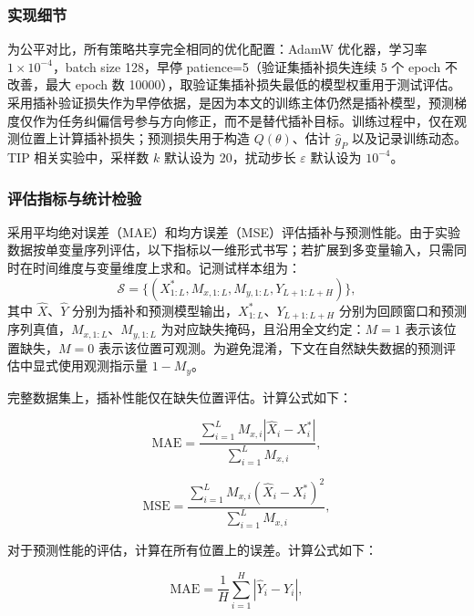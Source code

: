 \documentclass{article}
\begin{document}
\subsubsection{实现细节}

为公平对比，所有策略共享完全相同的优化配置：AdamW 优化器，学习率 $1\times10^{-4}$，batch size 128，早停 patience=5（验证集插补损失连续 5 个 epoch 不改善，最大 epoch 数 10000），取验证集插补损失最低的模型权重用于测试评估。采用插补验证损失作为早停依据，是因为本文的训练主体仍然是插补模型，预测梯度仅作为任务纠偏信号参与方向修正，而不是替代插补目标。训练过程中，仅在观测位置上计算插补损失；预测损失用于构造 $Q(\theta)$、估计 $\hat{g}_P$ 以及记录训练动态。TIP 相关实验中，采样数 $k$ 默认设为 20，扰动步长 $\varepsilon$ 默认设为 $10^{-4}$。

\subsubsection{评估指标与统计检验}

采用平均绝对误差（MAE）和均方误差（MSE）评估插补与预测性能。由于实验数据按单变量序列评估，以下指标以一维形式书写；若扩展到多变量输入，只需同时在时间维度与变量维度上求和。记测试样本组为：
\begin{equation}
	\mathcal{S} = \{(X^\ast_{1:L}, M_{x, 1:L}, M_{y, 1:L}, Y_{L+1:L+H})\},
\end{equation}
其中 $\hat{X}$、$\hat{Y}$ 分别为插补和预测模型输出，$X^\ast_{1:L}$、$Y_{L+1:L+H}$ 分别为回顾窗口和预测序列真值，$M_{x, 1:L}$、$M_{y, 1:L}$ 为对应缺失掩码，且沿用全文约定：$M=1$ 表示该位置缺失，$M=0$ 表示该位置可观测。为避免混淆，下文在自然缺失数据的预测评估中显式使用观测指示量 $1-M_y$。

完整数据集上，插补性能仅在缺失位置评估。计算公式如下：

\begin{equation}
	\text{MAE} =\frac{\sum_{i=1}^L M_{x, i} |\hat{X}_i - X^\ast_i|}{\sum_{i=1}^L M_{x, i}},
\end{equation}

\begin{equation}
	\text{MSE} =\frac{\sum_{i=1}^L M_{x, i} (\hat{X}_i - X^\ast_i)^2}{\sum_{i=1}^L M_{x, i}},
\end{equation}

对于预测性能的评估，计算在所有位置上的误差。计算公式如下：

\begin{equation}
	\text{MAE} =\frac{1}{H}\sum_{i=1}^H |\hat{Y}_i - Y_i|,
\end{equation}
\end{document}
